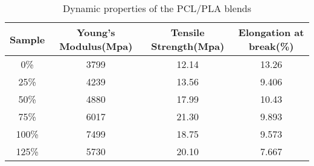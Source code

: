 \documentclass{Head}
\begin{document}
\begin{table}
    \centering
    \caption{Dynamic properties of the PCL/PLA blends}
    \begin{tabular}{cccc}
        \toprule
        Sample & Young's Modulus(Mpa) & Tensile Strength(Mpa) & Elongation at break(\%) \\
        \midrule
        0\%    & 3799                 & 12.14                 & 13.26                   \\
        25\%   & 4239                 & 13.56                 & 9.406                   \\
        50\%   & 4880                 & 17.99                 & 10.43                   \\
        75\%   & 6017                 & 21.30                 & 9.893                   \\
        100\%  & 7499                 & 18.75                 & 9.573                   \\
        125\%  & 5730                 & 20.10                 & 7.667                   \\
        \bottomrule
    \end{tabular}
\end{table}
\end{document}
